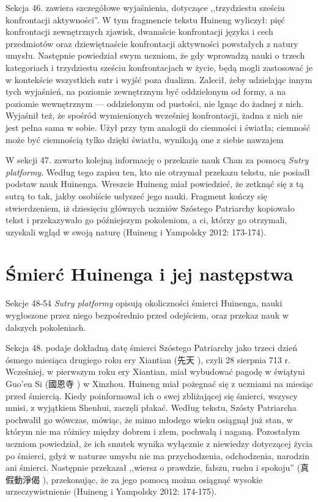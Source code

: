 Sekcja 46. zawiera szczegółowe wyjaśnienia, dotyczące ,,trzydziestu sześciu konfrontacji aktywności''. W tym fragmencie tekstu Huineng wyliczył: pięć konfrontacji zewnętrznych zjawisk, dwanaście konfrontacji języka i cech przedmiotów oraz dziewiętnaście konfrontacji aktywności powstałych z natury umysłu.
Następnie powiedział swym uczniom, że gdy wprowadzą nauki o trzech kategoriach i trzydziestu sześciu konfrontacjach w życie, będą mogli zastosować je w kontekście wszystkich sutr i wyjść poza dualizm.
Zalecił, żeby udzielając innym tych wyjaśnień, na poziomie zewnętrznym być oddzielonym od formy, a na poziomie wewnętrznym --- oddzielonym od pustości, nie lgnąc do żadnej z nich.
Wyjaśnił też, że spośród wymienionych wcześniej konfrontacji, żadna z nich nie jest pełna sama w sobie.
Użył przy tym analogii do ciemności i światła; ciemność może być ciemnością tylko dzięki światłu, wynikają one z siebie nawzajem\ibid

W sekcji 47. zawarto kolejną informację o przekazie nauk Chan za pomocą \textit{Sutry platformy}. %
Według tego zapisu ten, kto nie otrzymał przekazu tekstu, nie posiadł podstaw nauk Huinenga.
Wreszcie Huineng miał powiedzieć, że zetknąć się z tą sutrą to tak, jakby osobiście usłyszeć jego nauki.
Fragment kończy się stwierdzeniem, iż dziesięciu głównych uczniów Szóstego Patriarchy kopiowało tekst i przekazywało go późniejszym pokoleniom, a ci, którzy go otrzymali, uzyskali wgląd w swoją naturę
(Huineng i Yampolsky 2012: 173-174).

\section{Śmierć Huinenga i jej następstwa}
Sekcje 48-54 \textit{Sutry platformy} opisują okoliczności śmierci Huinenga, nauki wygłoszone przez niego bezpośrednio przed odejściem, oraz przekaz nauk w dalszych pokoleniach.

Sekcja 48. podaje dokładną datę śmierci Szóstego Patriarchy jako trzeci dzień ósmego miesiąca drugiego roku ery Xiantian (先天 ), czyli 28 sierpnia 713 r.
Wcześniej, w pierwszym roku ery Xiantian, miał wybudować pagodę w świątyni Guo'en Si (國恩寺 ) w Xinzhou.
Huineng miał pożegnać się z uczniami na miesiąc przed śmiercią.
Kiedy poinformował ich o swej zbliżającej się śmierci, wszyscy mnisi, z wyjątkiem Shenhui, zaczęli płakać.
Według tekstu, Szósty Patriarcha pochwalił go wówczas, mówiąc, że mimo młodego wieku osiągnął już stan, w którym nie ma różnicy między dobrem i złem, pochwałą i naganą.
Pozostałym uczniom powiedział, że ich smutek wynika wyłącznie z niewiedzy dotyczącej życia po śmierci, gdyż w naturze umysłu nie ma przychodzenia, odchodzenia, narodzin ani śmierci.
Następnie przekazał ,,wiersz o prawdzie, fałszu, ruchu i spokoju'' (真假動淨偈 ), przekonując, że za jego pomocą można osiągnąć wysokie urzeczywistnienie
(Huineng i Yampolsky 2012: 174-175).

